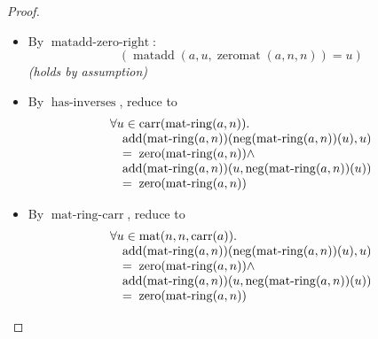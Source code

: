 \documentclass[11pt]{article}
\theoremstyle{plain}
\begin{document}
\begin{proof}
\begin{itemize}[leftmargin=2.8em, itemsep=4pt, parsep=1pt]
  \item[\textbf{72--73}] By $\operatorname{matadd\text{-}zero\text{-}right}$:
\begin{equation*}
(\operatorname{matadd}(a, u, \operatorname{zeromat}(a, n, n)) = u)
\end{equation*}
  \emph{(holds by assumption)}
  \item[\textbf{74}] By $\operatorname{has\text{-}inverses}$, reduce to
\begin{equation*}
\begin{array}{@{}l@{}} \forall u \in \operatorname{carr}(\operatorname{mat\text{-}ring}(a, n)). \\ \quad \operatorname{add}(\operatorname{mat\text{-}ring}(a, n))(\operatorname{neg}(\operatorname{mat\text{-}ring}(a, n))(u), u) \\ \quad =\; \operatorname{zero}(\operatorname{mat\text{-}ring}(a, n)) \wedge \\ \quad \operatorname{add}(\operatorname{mat\text{-}ring}(a, n))(u, \operatorname{neg}(\operatorname{mat\text{-}ring}(a, n))(u)) \\ \quad =\; \operatorname{zero}(\operatorname{mat\text{-}ring}(a, n)) \end{array}
\end{equation*}

  \item[\textbf{75}] By $\operatorname{mat\text{-}ring\text{-}carr}$, reduce to
\begin{equation*}
\begin{array}{@{}l@{}} \forall u \in \operatorname{mat}(n, n, \operatorname{carr}(a)). \\ \quad \operatorname{add}(\operatorname{mat\text{-}ring}(a, n))(\operatorname{neg}(\operatorname{mat\text{-}ring}(a, n))(u), u) \\ \quad =\; \operatorname{zero}(\operatorname{mat\text{-}ring}(a, n)) \wedge \\ \quad \operatorname{add}(\operatorname{mat\text{-}ring}(a, n))(u, \operatorname{neg}(\operatorname{mat\text{-}ring}(a, n))(u)) \\ \quad =\; \operatorname{zero}(\operatorname{mat\text{-}ring}(a, n)) \end{array}
\end{equation*}


\end{itemize}
\end{proof}
\end{document}
